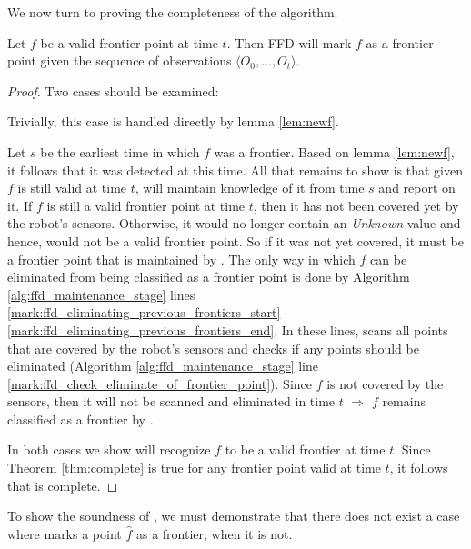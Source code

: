 We now turn to proving the completeness of the \FFD algorithm. 
\begin{theorem}
 \label{thm:complete}
Let $f$ be a valid frontier point at time $t$. Then FFD will mark $f$ as a frontier point
given the sequence of observations $\langle O_0,\ldots,O_t\rangle$.
\end{theorem}

\begin{proof}
Two cases should be examined:

 Trivially,
this case is handled directly by lemma \ref{lem:newf}.

Let $s$ be the earliest time in which $f$ was a frontier. Based on lemma 
\ref{lem:newf}, it follows that it was detected at this time. All that  remains
to show is that given $f$ is still valid at time $t$, \FFD will maintain
knowledge of it from time $s$ and report on it.
If $f$ is still a valid frontier point at time
$t$, then it has not been covered yet by the robot's sensors. Otherwise, it
would  no longer contain an \emph{Unknown} value and hence, would not
be a valid frontier point.  
So if it was not yet covered, it must be a frontier point that is maintained by 
\FFD. The only way in which $f$ can be eliminated from  being classified
as a frontier point is done by Algorithm \ref{alg:ffd_maintenance_stage} lines
\ref{mark:ffd_eliminating_previous_frontiers_start}--\ref{mark:ffd_eliminating_previous_frontiers_end}.
In these lines, \FFD scans all points that are covered by the robot's sensors
and checks if any points should be eliminated (Algorithm
\ref{alg:ffd_maintenance_stage} line
\ref{mark:ffd_check_eliminate_of_frontier_point}). Since $f$ is not covered by
the sensors, then it will not be scanned and eliminated in time $t$
$\Rightarrow$ $f$ remains classified as a frontier by \FFD.


In both cases we show \FFD will recognize $f$ to be a valid frontier at time $t$.
Since Theorem \ref{thm:complete} is true for any frontier point valid at time $t$,
it follows that \FFD is complete.   
\end{proof}


To show the soundness of \FFD, we must demonstrate that there does not exist a case
where \FFD marks a point $\hat{f}$ as a frontier, when it is not.

